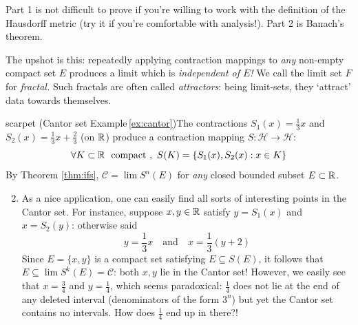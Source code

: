 Part 1 is not difficult to prove if you're willing to work with the definition of the Hausdorff metric (try it if you're comfortable with analysis!). Part 2 is Banach's theorem.\smallbreak

The upshot is this: repeatedly applying contraction mappings to \emph{any} non-empty compact set $E$ produces a limit which is \emph{independent of $E$!} We call the limit set $F$ for \emph{fractal.} Such fractals are often called \emph{attractors}: being limit-sets, they `attract' data towards themselves.

\goodbreak


\begin{examples}{}{scarpet}
	\exstart (Cantor set Example\,\ref{ex:cantor})\lstsp The contractions $S_1(x)=\frac 13x$ and $S_2(x)=\frac 13x+\frac 23$ (on $\mathbb{R}$) produce a contraction mapping $S:\mathcal H\to\mathcal H$:
	\[
		\forall K\subset\R\ \text{ compact },\ S(K)=\{S_1(x),S_2(x):x\in K\}
	\]
	By Theorem \ref{thm:ifs}, $\mathcal C=\lim S^n(E)$ for \emph{any} closed bounded subset $E\subset\mathbb{R}$.	
	\begin{enumerate}\setcounter{enumi}{1}
	  \item[]As a nice application, one can easily find all sorts of interesting points in the Cantor set. For instance, suppose $x,y\in\mathbb{R}$ satisfy $y=S_1(x)$ and $x=S_2(y)$: otherwise said
		\[
			y=\frac 13 x\quad\text{and}\quad x=\frac 13(y+2)
		\]
		Since $E=\{x,y\}$ is a compact set satisfying $E\subseteq S(E)$, it follows that $E\subseteq\lim S^k(E)=\mathcal C$: both $x,y$ lie in the Cantor set! However, we easily see that $x=\frac 34$ and $y=\frac 14$, which seems paradoxical: $\frac 14$ does not lie at the end of any deleted interval (denominators of the form $3^n$) but yet the Cantor set contains no intervals. How does $\frac 14$ end up in there?!
	

\end{enumerate}
\end{examples}
